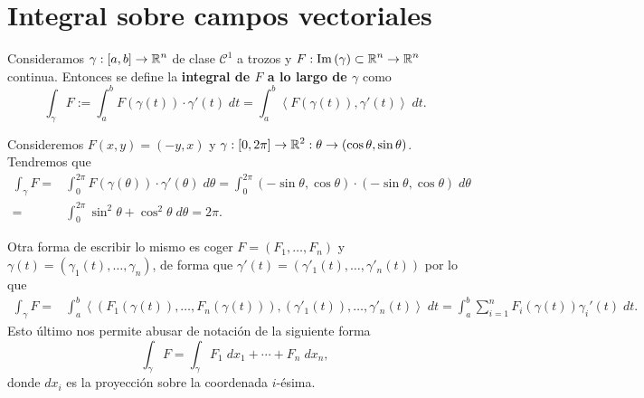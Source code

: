 \section{Integral sobre campos vectoriales}
\begin{definition}
Consideramos $\displaystyle \gamma : \left[a,b\right] \to \mathbb{R}^{n} $ de clase $\displaystyle \mathcal{C}^{1} $ a trozos y $\displaystyle F : \operatorname{Im}\left(\gamma \right)\subset \mathbb{R}^{n} \to \mathbb{R}^{n} $ continua. Entonces se define la \textbf{integral de $\displaystyle F $ a lo largo de $\displaystyle \gamma  $} como 
\[\int _{\gamma }F := \int^{b}_{a} F\left(\gamma \left(t\right)\right) \cdot \gamma'\left(t\right) \; dt = \int^{b}_{a} \left\langle F\left(\gamma\left(t\right)\right), \gamma'\left(t\right) \right\rangle  \; dt .\]
\end{definition}
\begin{eg}
	Consideremos $\displaystyle F\left(x,y\right)=\left(-y,x\right) $ y $\displaystyle \gamma : \left[0, 2\pi \right] \to \mathbb{R}^{2} : \theta \to \left(\cos\theta, \sin\theta\right) $. Tendremos que 
	\[
	\begin{split}
		\int _{\gamma }F = &\int^{2\pi }_{0} F\left(\gamma\left(\theta\right)\right) \cdot \gamma'\left(\theta \right) \; d\theta = \int^{2\pi }_{0} \left(-\sin \theta, \cos\theta\right) \cdot \left(-\sin\theta, \cos\theta\right) \; d\theta \\
		= &  \int^{2\pi }_{0} \sin ^{2}\theta + \cos^{2}\theta \; d\theta = 2\pi  .
	\end{split}
	\]
\end{eg}
\begin{notation}
Otra forma de escribir lo mismo es coger $\displaystyle F = \left(F_{1}, \ldots, F_{n}\right) $ y $\displaystyle \gamma\left(t\right)=\left(\gamma_{1}\left(t\right), \ldots, \gamma_{n}\right) $, de forma que $\displaystyle \gamma'\left(t\right)=\left(\gamma'_{1}\left(t\right), \ldots, \gamma'_{n}\left(t\right)\right) $ por lo que
\[
\begin{split}
	\int _{\gamma }F = & \int^{b}_{a} \left\langle \left(F_{1}\left(\gamma\left(t\right)\right), \ldots, F_{n}\left(\gamma\left(t\right)\right)\right), \left(\gamma'_{1}\left(t\right)\right), \ldots, \gamma'_{n}\left(t\right) \right\rangle  \; dt=\int^{b}_{a} \sum^{n}_{i = 1}F_{i}\left(\gamma\left(t\right)\right)\gamma_{i}'\left(t\right) \; dt .
\end{split}
\]
Esto último nos permite abusar de notación de la siguiente forma
\[\int _{\gamma }F = \int _{\gamma }F_{1} \; dx_{1} + \cdots + F_{n} \; dx_{n} ,\]
donde $\displaystyle dx_{i} $ es la proyección sobre la coordenada $\displaystyle i $-ésima.
\end{notation}
